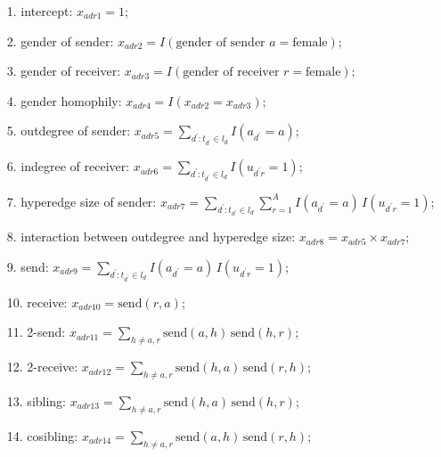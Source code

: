 \documentclass[ba]{imsart}
\numberwithin{equation}{section}
\theoremstyle{plain}
\begin{document}
	\begin{itemize}
		\item[1.] intercept: ${x}_{adr1} =1$;
		\item[2.] gender of sender: ${x}_{adr2} = I(\mbox{gender of sender } a= \mbox{female});$
		\item[3.] gender of receiver: ${x}_{adr3} = I(\mbox{gender of receiver } r= \mbox{female});$
		\item[4.] gender homophily: ${x}_{adr4} = I({x}_{adr2}={x}_{adr3});$ 	   		
		\item[5.] outdegree of sender: ${x}_{adr5} =\sum_{d^\prime: t_{d^\prime} \in l_d} I(a_{d^\prime} = a)$;
		\item[6.] indegree of receiver: ${x}_{adr6}=\sum_{d^\prime: t_{d^\prime} \in l_d} I(u_{d^\prime r} = 1)$;
		\item[7.] hyperedge size of sender: ${x}_{adr7}=\sum_{d^\prime: t_{d^\prime} \in l_d} \sum_{r=1}^A I(a_{d^\prime} = a)\,I(u_{d^\prime r} = 1)$;
		\item[8.] interaction between outdegree and hyperedge size: ${x}_{adr8} = {x}_{adr5}\times{x}_{adr7};$
		\item[9.] send: ${x}_{adr9}=\sum_{d^\prime: t_{d^\prime} \in l_d} I(a_{d^\prime} = a)\,I(u_{d^\prime r} = 1)$;
		\item[10.] receive: ${x}_{adr10}=\mbox{send}(r,a)$;
		\item[11.] 2-send: ${x}_{adr11} = \sum_{h \neq a, r} \mbox{send}(a,h)\,\mbox{send}(h,r)$;
		\item[12.] 2-receive: ${x}_{adr12}= \sum_{h \neq a, r} \mbox{send}(h,a)\,\mbox{send}(r,h)$;
		\item[13.] sibling: ${x}_{adr13}=\sum_{h \neq a, r} \mbox{send}(h,a)\,\mbox{send}(h,r)$;
		\item[14.] cosibling: ${x}_{adr14}=\sum_{h \neq a, r} \mbox{send}(a,h)\,\mbox{send}(r,h)$;
	\end{itemize}
\end{document}
